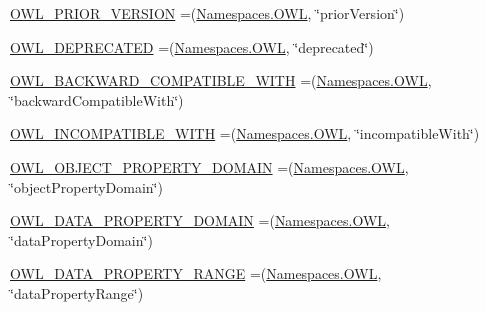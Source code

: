 \begin{DoxyCompactItemize}
\item 
\hyperlink{enumorg_1_1semanticweb_1_1owlapi_1_1vocab_1_1_o_w_l_r_d_f_vocabulary_a8a79215cf95e037d645aa20996e0c4bd}{O\-W\-L\-\_\-\-P\-R\-I\-O\-R\-\_\-\-V\-E\-R\-S\-I\-O\-N} =(\hyperlink{enumorg_1_1semanticweb_1_1owlapi_1_1vocab_1_1_namespaces_a2fcb537074d9307ef1356ffb6a5bd6f4}{Namespaces.\-O\-W\-L}, \char`\"{}prior\-Version\char`\"{})
\item 
\hyperlink{enumorg_1_1semanticweb_1_1owlapi_1_1vocab_1_1_o_w_l_r_d_f_vocabulary_af98ec06d1111cff259cc8ae06f090c45}{O\-W\-L\-\_\-\-D\-E\-P\-R\-E\-C\-A\-T\-E\-D} =(\hyperlink{enumorg_1_1semanticweb_1_1owlapi_1_1vocab_1_1_namespaces_a2fcb537074d9307ef1356ffb6a5bd6f4}{Namespaces.\-O\-W\-L}, \char`\"{}deprecated\char`\"{})
\item 
\hyperlink{enumorg_1_1semanticweb_1_1owlapi_1_1vocab_1_1_o_w_l_r_d_f_vocabulary_a5d710803bde31de7900442b9768c0f44}{O\-W\-L\-\_\-\-B\-A\-C\-K\-W\-A\-R\-D\-\_\-\-C\-O\-M\-P\-A\-T\-I\-B\-L\-E\-\_\-\-W\-I\-T\-H} =(\hyperlink{enumorg_1_1semanticweb_1_1owlapi_1_1vocab_1_1_namespaces_a2fcb537074d9307ef1356ffb6a5bd6f4}{Namespaces.\-O\-W\-L}, \char`\"{}backward\-Compatible\-With\char`\"{})
\item 
\hyperlink{enumorg_1_1semanticweb_1_1owlapi_1_1vocab_1_1_o_w_l_r_d_f_vocabulary_a830ce77fb5e74e14a58fd6eae4cc1020}{O\-W\-L\-\_\-\-I\-N\-C\-O\-M\-P\-A\-T\-I\-B\-L\-E\-\_\-\-W\-I\-T\-H} =(\hyperlink{enumorg_1_1semanticweb_1_1owlapi_1_1vocab_1_1_namespaces_a2fcb537074d9307ef1356ffb6a5bd6f4}{Namespaces.\-O\-W\-L}, \char`\"{}incompatible\-With\char`\"{})
\item 
\hyperlink{enumorg_1_1semanticweb_1_1owlapi_1_1vocab_1_1_o_w_l_r_d_f_vocabulary_aafe74092031f47dc40fce9252194a116}{O\-W\-L\-\_\-\-O\-B\-J\-E\-C\-T\-\_\-\-P\-R\-O\-P\-E\-R\-T\-Y\-\_\-\-D\-O\-M\-A\-I\-N} =(\hyperlink{enumorg_1_1semanticweb_1_1owlapi_1_1vocab_1_1_namespaces_a2fcb537074d9307ef1356ffb6a5bd6f4}{Namespaces.\-O\-W\-L}, \char`\"{}object\-Property\-Domain\char`\"{})
\item 
\hyperlink{enumorg_1_1semanticweb_1_1owlapi_1_1vocab_1_1_o_w_l_r_d_f_vocabulary_acc262966c297c2ba17b5ceaf6da15d99}{O\-W\-L\-\_\-\-D\-A\-T\-A\-\_\-\-P\-R\-O\-P\-E\-R\-T\-Y\-\_\-\-D\-O\-M\-A\-I\-N} =(\hyperlink{enumorg_1_1semanticweb_1_1owlapi_1_1vocab_1_1_namespaces_a2fcb537074d9307ef1356ffb6a5bd6f4}{Namespaces.\-O\-W\-L}, \char`\"{}data\-Property\-Domain\char`\"{})
\item 
\hyperlink{enumorg_1_1semanticweb_1_1owlapi_1_1vocab_1_1_o_w_l_r_d_f_vocabulary_ad9c0dd7a49b1503fb9f2d7f04b51344d}{O\-W\-L\-\_\-\-D\-A\-T\-A\-\_\-\-P\-R\-O\-P\-E\-R\-T\-Y\-\_\-\-R\-A\-N\-G\-E} =(\hyperlink{enumorg_1_1semanticweb_1_1owlapi_1_1vocab_1_1_namespaces_a2fcb537074d9307ef1356ffb6a5bd6f4}{Namespaces.\-O\-W\-L}, \char`\"{}data\-Property\-Range\char`\"{})

\end{DoxyCompactItemize}
